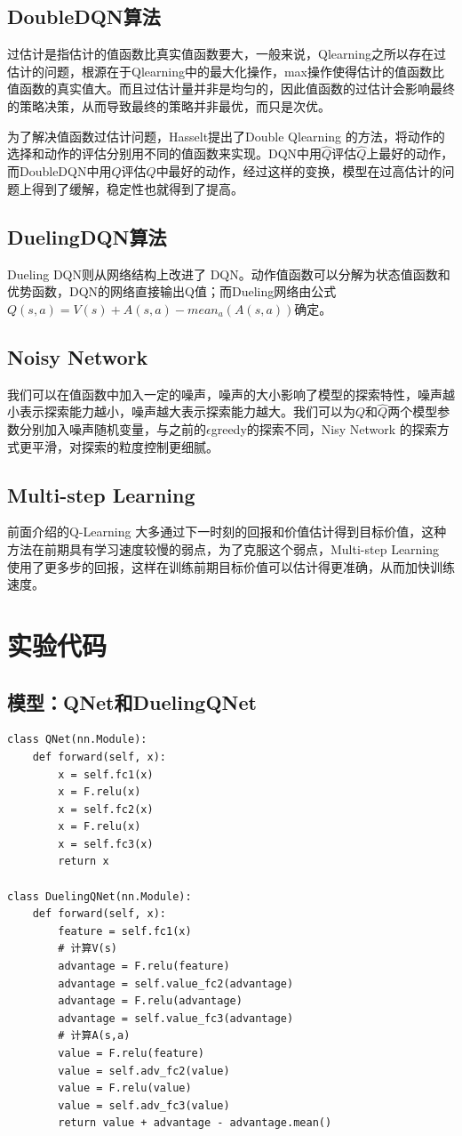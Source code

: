 \documentclass[a4paper]{ctexart}
\begin{document}
\subsection{DoubleDQN算法}
过估计是指估计的值函数比真实值函数要大，一般来说，Qlearning之所以存在过估计的问题，根源在于Qlearning中的最大化操作，max操作使得估计的值函数比值函数的真实值大。而且过估计量并非是均匀的，因此值函数的过估计会影响最终的策略决策，从而导致最终的策略并非最优，而只是次优。

为了解决值函数过估计问题，Hasselt提出了Double Qlearning 的方法，将动作的选择和动作的评估分别⽤不同的值函数来实现。DQN中用$\hat{Q}$评估$\hat{Q}$上最好的动作，而DoubleDQN中用$\hat{Q}$评估$Q$中最好的动作，经过这样的变换，模型在过高估计的问题上得到了缓解，稳定性也就得到了提高。

\subsection{DuelingDQN算法}
Dueling DQN则从⽹络结构上改进了 DQN。动作值函数可以分解为状态值函数和优势函数，DQN的网络直接输出Q值；而Dueling网络由公式$Q(s,a)=V(s)+A(s,a)-mean_a(A(s,a))$确定。

\subsection{Noisy Network}
我们可以在值函数中加入一定的噪声，噪声的大小影响了模型的探索特性，噪声越小表示探索能力越小，噪声越大表示探索能力越大。我们可以为$Q$和$\hat{Q}$两个模型参数分别加入噪声随机变量，与之前的$\epsilon$greedy的探索不同，Nisy Network 的探索方式更平滑，对探索的粒度控制更细腻。

\subsection{Multi-step Learning}
前面介绍的Q-Learning 大多通过下一时刻的回报和价值估计得到目标价值，这种方法在前期具有学习速度较慢的弱点，为了克服这个弱点，Multi-step Learning 使用了更多步的回报，这样在训练前期目标价值可以估计得更准确，从而加快训练速度。

\section{实验代码}
\subsection{模型：QNet和DuelingQNet}
\begin{verbatim}
class QNet(nn.Module):
    def forward(self, x):
        x = self.fc1(x)
        x = F.relu(x)
        x = self.fc2(x)
        x = F.relu(x)
        x = self.fc3(x)
        return x

class DuelingQNet(nn.Module):
    def forward(self, x):
        feature = self.fc1(x)
        # 计算V(s)
        advantage = F.relu(feature)
        advantage = self.value_fc2(advantage)
        advantage = F.relu(advantage)
        advantage = self.value_fc3(advantage)
        # 计算A(s,a)
        value = F.relu(feature)
        value = self.adv_fc2(value)
        value = F.relu(value)
        value = self.adv_fc3(value)
        return value + advantage - advantage.mean()
\end{verbatim}
\end{document}
